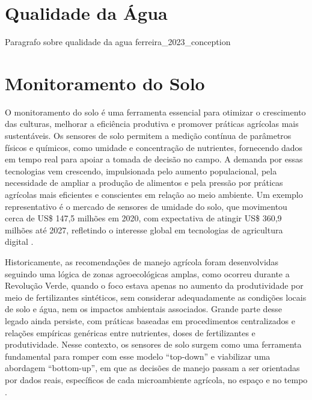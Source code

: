 \section{Qualidade da Água}
Paragrafo sobre qualidade da agua
ferreira_2023_conception

\section{Monitoramento do Solo}

O monitoramento do solo é uma ferramenta essencial para otimizar o crescimento das culturas, melhorar a eficiência produtiva e promover práticas agrícolas mais sustentáveis. Os sensores de solo permitem a medição contínua de parâmetros físicos e químicos, como umidade e concentração de nutrientes, fornecendo dados em tempo real para apoiar a tomada de decisão no campo. A demanda por essas tecnologias vem crescendo, impulsionada pelo aumento populacional, pela necessidade de ampliar a produção de alimentos e pela pressão por práticas agrícolas mais eficientes e conscientes em relação ao meio ambiente. Um exemplo representativo é o mercado de sensores de umidade do solo, que movimentou cerca de US\$ 147{,}5 milhões em 2020, com expectativa de atingir US\$ 360{,}9 milhões até 2027, refletindo o interesse global em tecnologias de agricultura digital \cite{yin_2021_smart} .

Historicamente, as recomendações de manejo agrícola foram desenvolvidas seguindo uma lógica de zonas agroecológicas amplas, como ocorreu durante a Revolução Verde, quando o foco estava apenas no aumento da produtividade por meio de fertilizantes sintéticos, sem considerar adequadamente as condições locais de solo e água, nem os impactos ambientais associados. Grande parte desse legado ainda persiste, com práticas baseadas em procedimentos centralizados e relações empíricas genéricas entre nutrientes, doses de fertilizantes e produtividade. Nesse contexto, os sensores de solo surgem como uma ferramenta fundamental para romper com esse modelo “top-down” e viabilizar uma abordagem “bottom-up”, em que as decisões de manejo passam a ser orientadas por dados reais, específicos de cada microambiente agrícola, no espaço e no tempo \cite{viscarrarossel_2016_soil}.

